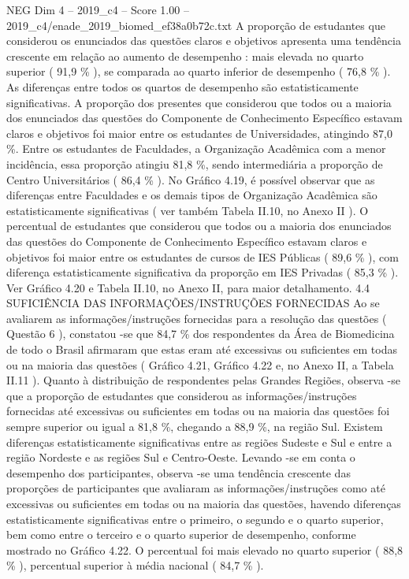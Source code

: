 \begin{textsample}{NEG Dim 4 – 2019\_c4 – Score 1.00 – 2019\_c4/enade\_2019\_biomed\_ef38a0b72c.txt}
A proporção de estudantes que considerou os enunciados das questões claros e objetivos apresenta uma tendência crescente em relação ao aumento de desempenho : mais elevada no quarto superior ( 91,9 \% ), se comparada ao quarto inferior de desempenho ( 76,8 \% ).
As diferenças entre todos os quartos de desempenho são estatisticamente significativas.
A proporção dos presentes que considerou que todos ou a maioria dos enunciados das questões do Componente de Conhecimento Específico estavam claros e objetivos foi maior entre os estudantes de Universidades, atingindo 87,0 \%.
Entre os estudantes de Faculdades, a Organização Acadêmica com a menor incidência, essa proporção atingiu 81,8 \%, sendo intermediária a proporção de Centro Universitários ( 86,4 \% ).
No Gráfico 4.19, é possível observar que as diferenças entre Faculdades e os demais tipos de Organização Acadêmica são estatisticamente significativas ( ver também Tabela II.10, no Anexo II ).
O percentual de estudantes que considerou que todos ou a maioria dos enunciados das questões do Componente de Conhecimento Específico estavam claros e objetivos foi maior entre os estudantes de cursos de IES Públicas ( 89,6 \% ), com diferença estatisticamente significativa da proporção em IES Privadas ( 85,3 \% ).
Ver Gráfico 4.20 e Tabela II.10, no Anexo II, para maior detalhamento. 4.4 SUFICIÊNCIA DAS INFORMAÇÕES/INSTRUÇÕES FORNECIDAS Ao se avaliarem as informações/instruções fornecidas para a resolução das questões ( Questão 6 ), constatou -se que 84,7 \% dos respondentes da Área de Biomedicina de todo o Brasil afirmaram que estas eram até excessivas ou suficientes em todas ou na maioria das questões ( Gráfico 4.21, Gráfico 4.22 e, no Anexo II, a Tabela II.11 ).
Quanto à distribuição de respondentes pelas Grandes Regiões, observa -se que a proporção de estudantes que considerou as informações/instruções fornecidas até excessivas ou suficientes em todas ou na maioria das questões foi sempre superior ou igual a 81,8 \%, chegando a 88,9 \%, na região Sul.
Existem diferenças estatisticamente significativas entre as regiões Sudeste e Sul e entre a região Nordeste e as regiões Sul e Centro-Oeste.
Levando -se em conta o desempenho dos participantes, observa -se uma tendência crescente das proporções de participantes que avaliaram as informações/instruções como até excessivas ou suficientes em todas ou na maioria das questões, havendo diferenças estatisticamente significativas entre o primeiro, o segundo e o quarto superior, bem como entre o terceiro e o quarto superior de desempenho, conforme mostrado no Gráfico 4.22.
O percentual foi mais elevado no quarto superior ( 88,8 \% ), percentual superior à média nacional ( 84,7 \% ).

\end{textsample}
